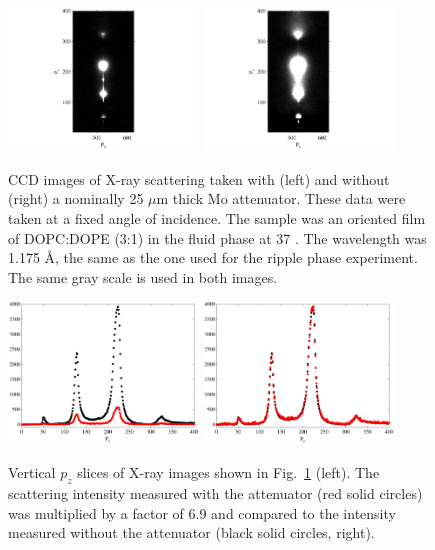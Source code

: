 \begin{figure}[jtbp]
  \centering
  \includegraphics[trim=100 0 100 0,clip,width=0.45\textwidth]{figures/ripple/olddopc045}
  \includegraphics[trim=100 0 100 0,clip,width=0.45\textwidth]{figures/ripple/olddopc044}
  \caption{CCD images of X-ray scattering taken with (left) and without 
  (right) a nominally 25 $\mu$m thick Mo attenuator. These data were taken 
  at a fixed angle of incidence. The sample was an oriented film of 
  DOPC:DOPE (3:1) in the fluid phase at 37 \textcelsius. The wavelength
  was 1.175 \AA, the same as the one used for the ripple phase experiment.
  The same gray scale is used in both images.}
  \label{fig:olddopc}
\end{figure}

\begin{figure}[htbp]
  \centering
  \includegraphics[width=0.45\textwidth]{figures/ripple/attenuator1}
  \includegraphics[width=0.45\textwidth]{figures/ripple/attenuator2}
  \caption{Vertical $p_z$ slices of X-ray images shown in Fig.~\ref{fig:olddopc}
  (left). The scattering intensity measured with the attenuator (red solid circles) 
  was multiplied by 
  a factor of 6.9 and compared to the intensity measured 
  without the attenuator (black solid circles, right).}
  \label{fig:attenuator}
\end{figure}

